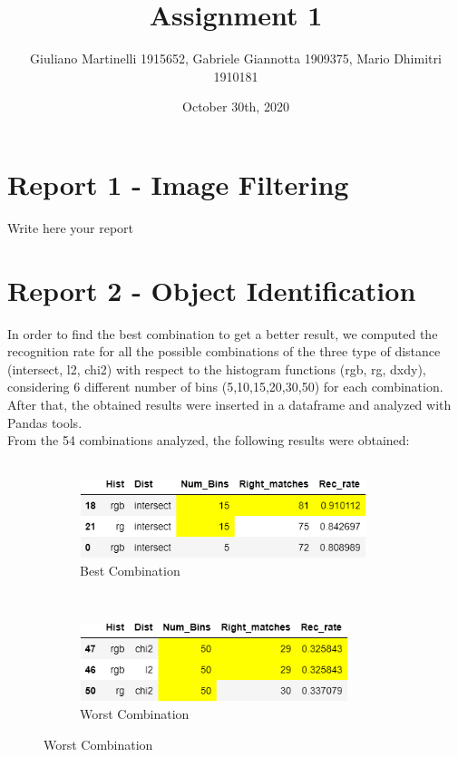 \documentclass[
	12pt, %
]{fphw}
\title{Assignment 1} %
\author{Giuliano Martinelli 1915652, Gabriele Giannotta 1909375, Mario Dhimitri 1910181 } %
\date{October 30th, 2020} %
\institute{Sapienza Università di Roma \\ Data Science} %
\begin{document}
\maketitle %


\section*{Report 1 - Image Filtering}

Write here your report


\newpage
\section*{Report 2 - Object Identification}


In order to find the best combination to get a better result, we computed the recognition rate for all the possible combinations of the three type of distance (intersect, l2, chi2) with respect to the histogram functions (rgb, rg, dxdy), considering 6 different number of bins (5,10,15,20,30,50) for each combination. After that, the obtained results were inserted in a dataframe and analyzed with Pandas tools. \\
From the 54 combinations analyzed, the following results were obtained:\\ \\


\begin{figure}[h!]
    \centering
    \begin{subfigure}[t]{0.5\textwidth}
        \centering
        \includegraphics[height=0.9in]{img/best_combination.png}
         \caption{Best Combination}
    \end{subfigure}%
    ~ 
    \begin{subfigure}[t]{0.5\textwidth}
        \centering
        \includegraphics[height=0.9in]{img/worst_combination.png}
         \caption{Worst Combination}
	\end{subfigure}

\end{figure}
\end{document}
